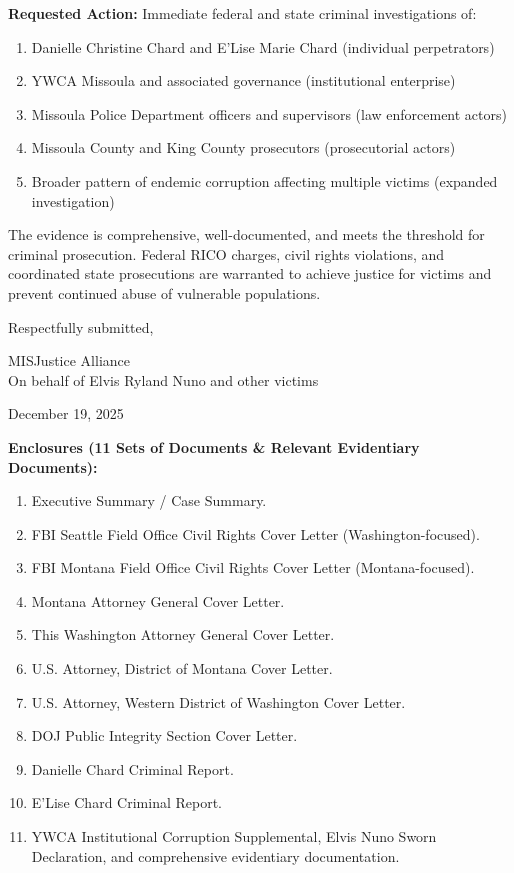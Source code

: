\documentclass[12pt,oneside]{article}
\begin{document}
\textbf{Requested Action:} Immediate federal and state criminal investigations of:
\begin{enumerate}
\item Danielle Christine Chard and E'Lise Marie Chard (individual perpetrators)
\item YWCA Missoula and associated governance (institutional enterprise)
\item Missoula Police Department officers and supervisors (law enforcement actors)
\item Missoula County and King County prosecutors (prosecutorial actors)
\item Broader pattern of endemic corruption affecting multiple victims (expanded investigation)
\end{enumerate}

The evidence is comprehensive, well-documented, and meets the threshold for criminal prosecution. Federal RICO charges, civil rights violations, and coordinated state prosecutions are warranted to achieve justice for victims and prevent continued abuse of vulnerable populations.

\vspace{0.3in}

\noindent
Respectfully submitted,

\vspace{0.3in}

\noindent
MISJustice Alliance \\
On behalf of Elvis Ryland Nuno and other victims

\vspace{0.2in}

\noindent
December 19, 2025

\vspace{0.3in}

\noindent
\textbf{Enclosures (11 Sets of Documents \& Relevant Evidentiary Documents):}
\begin{enumerate}
\item Executive Summary / Case Summary.
\item FBI Seattle Field Office Civil Rights Cover Letter (Washington-focused).
\item FBI Montana Field Office Civil Rights Cover Letter (Montana-focused).
\item Montana Attorney General Cover Letter.
\item This Washington Attorney General Cover Letter.
\item U.S. Attorney, District of Montana Cover Letter.
\item U.S. Attorney, Western District of Washington Cover Letter.
\item DOJ Public Integrity Section Cover Letter.
\item Danielle Chard Criminal Report.
\item E'Lise Chard Criminal Report.
\item YWCA Institutional Corruption Supplemental, Elvis Nuno Sworn Declaration, and comprehensive evidentiary documentation.
\end{enumerate}
\end{document}
